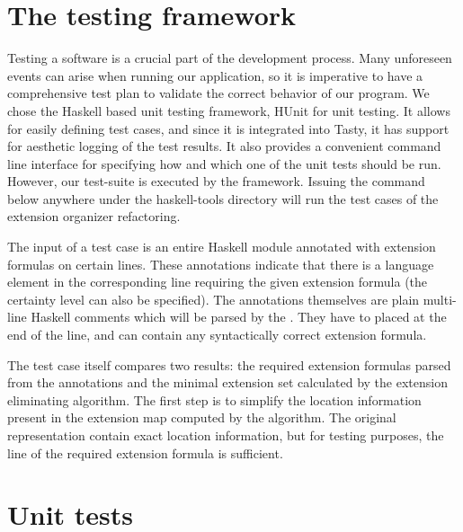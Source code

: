 \documentclass[main.tex]{subfiles}
\begin{document}
	
	\section{The testing framework}
	
	Testing a software is a crucial part of the development process. Many unforeseen events can arise when running our application, so it is imperative to have a comprehensive test plan to validate the correct behavior of our program. We chose the Haskell based unit testing framework, HUnit for unit testing. It allows for easily defining test cases, and since it is integrated into Tasty, it has support for aesthetic logging of the test results. It also provides a convenient command line interface for specifying how and which one of the unit tests should be run. However, our test-suite is executed by the  framework. Issuing the command below anywhere under the haskell-tools directory will run the test cases of the extension organizer refactoring.
	
	
	The input of a test case is an entire Haskell module annotated with extension formulas on certain lines. These annotations indicate that there is a language element in the corresponding line requiring the given extension formula (the certainty level can also be specified). The annotations themselves are plain multi-line Haskell comments which will be parsed by the . They have to placed at the end of the line, and can contain any syntactically correct extension formula.
	
	The test case itself compares two results: the required extension formulas parsed from the annotations and the minimal extension set calculated by the extension eliminating algorithm. The first step is to simplify the location information present in the extension map computed by the algorithm. The original representation contain exact location information, but for testing purposes, the line of the required extension formula is sufficient.
	
	\section{Unit tests}
	\begin{spacing}{1}
		
	\end{spacing}
		
	
	
	
\end{document}
